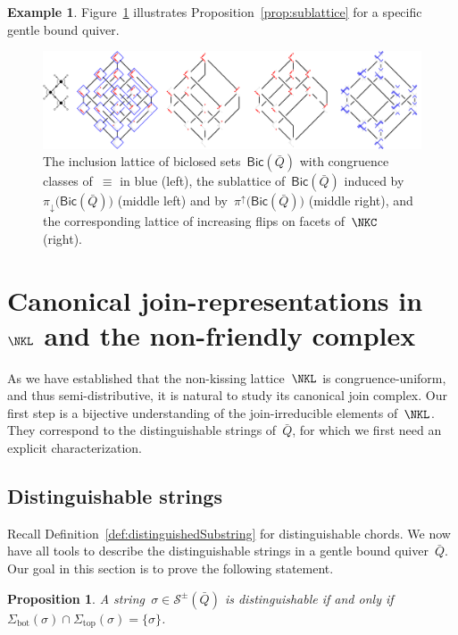 \documentclass{amsart}
\newtheorem{proposition}[theorem]{Proposition}
\theoremstyle{definition}
\newtheorem{example}[theorem]{Example}
\newcommand{\fref}[1]{Figure~\ref{#1}} %
\newcommand{\strings}{\mathcal{S}} %
\renewcommand{\top}{\mathrm{top}} %
\newcommand{\bottom}{\mathrm{bot}} %
\newcommand{\Bicl}[1]{\mathsf{Bic}(#1)} %
\newcommand{\projDown}{\pi_\downarrow} %
\newcommand{\projUp}{\pi^\uparrow} %
\begin{document}
\begin{example}
\fref{fig:exmSublattice} illustrates Proposition~\ref{prop:sublattice} for a specific gentle bound quiver.

\begin{figure}[t]
	\capstart
	\centerline{\includegraphics[width=1.1\textwidth]{exmSublattice}}
	\caption{The inclusion lattice of biclosed sets~$\Bicl{\bar Q}$ with congruence classes of~$\equiv$ in blue (left), the sublattice of~$\Bicl{\bar Q}$ induced by~$\projDown \big( \Bicl{\bar Q} \big)$ (middle left) and by~$\projUp \big( \Bicl{\bar Q} \big)$ (middle right), and the corresponding lattice of increasing flips on facets of~$\NKC$ (right).}
	\label{fig:exmSublattice}
\end{figure}
\end{example}

\section{Canonical join-representations in~$\NKL$ and the non-friendly complex}
\label{sec:nonFriendlyComplex}

As we have established that the non-kissing lattice~$\NKL$ is congruence-uniform, and thus semi-distributive, it is natural to study its canonical join complex.
Our first step is a bijective understanding of the join-irreducible elements of~$\NKL$.
They correspond to the distinguishable strings of~$\bar Q$, for which we first need an explicit characterization.

\subsection{Distinguishable strings}
\label{subsec:distinguishableStrings}

Recall Definition~\ref{def:distinguishedSubstring} for distinguishable chords.
We now have all tools to describe the distinguishable strings in a gentle bound quiver~$\bar Q$.
Our goal in this section is to prove the following statement.

\begin{proposition}
\label{prop:characterizationDistinguishableStrings}
A string~$\sigma \in \strings^\pm(\bar Q)$ is distinguishable if and only if $\Sigma_\bottom(\sigma) \cap \Sigma_\top(\sigma) = \{\sigma\}$.
\end{proposition}
\end{document}
